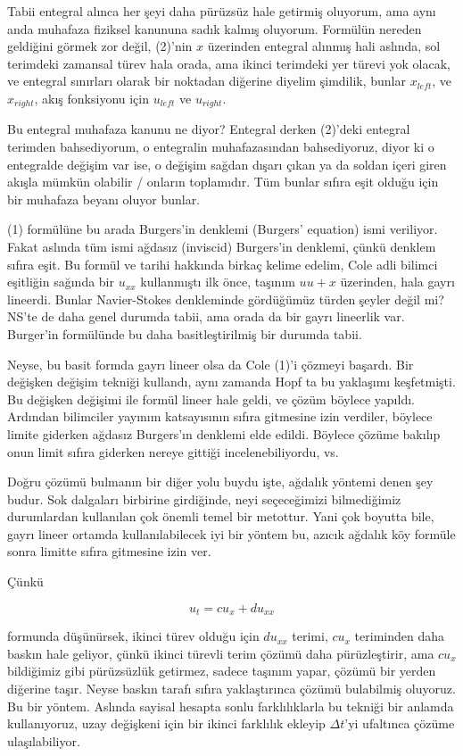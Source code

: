 \documentclass[12pt,fleqn]{article}\usepackage{../../common}
\begin{document}
Tabii entegral alınca her şeyi daha pürüzsüz hale getirmiş oluyorum, ama aynı
anda muhafaza fiziksel kanununa sadık kalmış oluyorum. Formülün nereden
geldiğini görmek zor değil, (2)'nin $x$ üzerinden entegral alınmış hali aslında,
sol terimdeki zamansal türev hala orada, ama ikinci terimdeki yer türevi
yok olacak, ve entegral sınırları olarak bir noktadan diğerine diyelim şimdilik,
bunlar $x_{left}$, ve $x_{right}$, akış fonksiyonu için $u_{left}$ ve $u_{right}$.

Bu entegral muhafaza kanunu ne diyor? Entegral derken (2)'deki entegral terimden
bahsediyorum, o entegralin muhafazasından bahsediyoruz, diyor ki o entegralde
değişim var ise, o değişim sağdan dışarı çıkan ya da soldan içeri giren akışla
mümkün olabilir / onların toplamıdır. Tüm bunlar sıfıra eşit olduğu için
bir muhafaza beyanı oluyor bunlar. 

(1) formülüne bu arada Burgers'in denklemi (Burgers' equation) ismi veriliyor.
Fakat aslında tüm ismi ağdasız (inviscid) Burgers'in denklemi, çünkü denklem
sıfıra eşit. Bu formül ve tarihi hakkında birkaç kelime edelim, Cole adli
bilimci eşitliğin sağında bir $u_{xx}$ kullanmıştı ilk önce, taşınım $u u+x$
üzerinden, hala gayrı lineerdi. Bunlar Navier-Stokes denkleminde gördüğümüz
türden şeyler değil mi?  NS'te de daha genel durumda tabii, ama orada da bir
gayrı lineerlik var. Burger'in formülünde bu daha basitleştirilmiş bir durumda
tabii.

Neyse, bu basit formda gayrı lineer olsa da Cole (1)'i çözmeyi başardı. Bir
değişken değişim tekniği kullandı, aynı zamanda Hopf ta bu yaklaşımı
keşfetmişti. Bu değişken değişimi ile formül lineer hale geldi, ve çözüm böylece
yapıldı. Ardından bilimciler yayınım katsayısının sıfıra gitmesine izin
verdiler, böylece limite giderken ağdasız Burgers'ın denklemi elde
edildi. Böylece çözüme bakılıp onun limit sıfıra giderken nereye gittiği
incelenebiliyordu, vs.

Doğru çözümü bulmanın bir diğer yolu buydu işte, ağdalık yöntemi denen şey
budur. Sok dalgaları birbirine girdiğinde, neyi seçeceğimizi bilmediğimiz
durumlardan kullanılan çok önemli temel bir metottur. Yani çok boyutta bile,
gayrı lineer ortamda kullanılabilecek iyi bir yöntem bu, azıcık ağdalık
köy formüle sonra limitte sıfıra gitmesine izin ver.

Çünkü

$$
u_t = c u_x + d u_{xx}
$$

formunda düşünürsek, ikinci türev olduğu için $d u_{xx}$ terimi, $c u_x$
teriminden daha baskın hale geliyor, çünkü ikinci türevli terim çözümü daha
pürüzleştirir, ama $c u_x$ bildiğimiz gibi pürüzsüzlük getirmez, sadece taşınım
yapar, çözümü bir yerden diğerine taşır. Neyse baskın tarafı sıfıra
yaklaştırınca çözümü bulabilmiş oluyoruz. Bu bir yöntem. Aslında sayisal hesapta
sonlu farklılıklarla bu tekniği bir anlamda kullanıyoruz, uzay değişkeni için
bir ikinci farklılık ekleyip $\Delta t$'yi ufaltınca çözüme ulaşılabiliyor.
\end{document}
